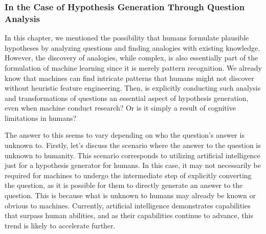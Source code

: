 \subsubsection{In the Case of Hypothesis Generation Through Question Analysis}

In this chapter, we mentioned the possibility that humans formulate plausible hypotheses by analyzing questions and finding analogies with existing knowledge. However, the discovery of analogies, while complex, is also essentially part of the formulation of machine learning since it is merely pattern recognition. We already know that machines can find intricate patterns that humans might not discover without heuristic feature engineering. Then, is explicitly conducting such analysis and transformations of questions an essential aspect of hypothesis generation, even when machine conduct research? Or is it simply a result of cognitive limitations in humans?

The answer to this seems to vary depending on who the question's answer is unknown to. Firstly, let's discuss the scenario where the answer to the question is unknown to humanity. This scenario corresponds to utilizing artificial intelligence just for a hypothesis generator for humans. In this case, it may not necessarily be required for machines to undergo the intermediate step of explicitly converting the question, as it is possible for them to directly generate an answer to the question. This is because what is unknown to humans may already be known or obvious to machines. Currently, artificial intelligence demonstrates capabilities that surpass human abilities, and as their capabilities continue to advance, this trend is likely to accelerate further.

